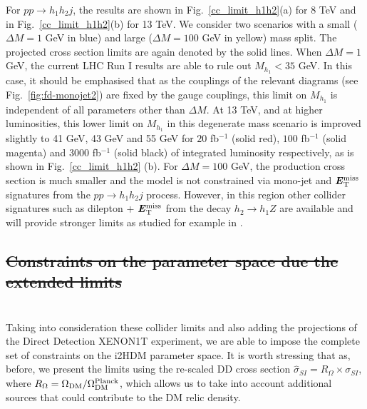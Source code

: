 \documentclass[12pt,a4paper]{article}
\newcommand{\MET}{\textbf{\textit{E}$_{\rm T}^{\rm miss}$}}
\providecommand{\DIFaddtex}[1]{{\protect\color{blue}\uwave{#1}}} %
\providecommand{\DIFdeltex}[1]{{\protect\color{red}\sout{#1}}}                      %
\providecommand{\DIFaddbegin}{} %
\providecommand{\DIFaddend}{} %
\providecommand{\DIFdelbegin}{} %
\providecommand{\DIFdelend}{} %
\providecommand{\DIFadd}[1]{\texorpdfstring{\DIFaddtex{#1}}{#1}} %
\providecommand{\DIFdel}[1]{\texorpdfstring{\DIFdeltex{#1}}{}} %
\begin{document}
For $pp\rightarrow h_1h_2 j$, the results are shown in Fig.~\ref{cc_limit_h1h2}(a) for 8 TeV and in Fig.~\ref{cc_limit_h1h2}(b) for 13 TeV. We consider two scenarios with a small ($\Delta M =1$ GeV in blue) and large ($\Delta M =100$ GeV in yellow) mass split. The projected cross section limits are again denoted by the solid lines. When $\Delta M = 1$ GeV, the current LHC Run I results are able to rule out $M_{h_1} < 35$ GeV. In this case, it should be emphasised that as the couplings of the relevant diagrams (see Fig.~\ref{fig:fd-monojet2}) are fixed by the gauge couplings, this limit on $M_{h_1}$ is independent of all parameters other than $\Delta M$. At 13 TeV, and at higher luminosities, this lower limit on $M_{h_1}$ in this degenerate mass scenario is improved slightly to 41 GeV, 43 GeV and 55 GeV for $20$ fb$^{-1}$ (solid red), $100$ fb$^{-1}$ (solid magenta) and $3000$ fb$^{-1}$ (solid black) of integrated luminosity respectively, as is shown in Fig.~\ref{cc_limit_h1h2} (b). For $\Delta M = 100$ GeV, the production cross section is much smaller and the model is not constrained via mono-jet and $\MET{}$ signatures from the $pp\rightarrow h_1h_2 j$ process. However, in this region other collider signatures such as dilepton + $\MET{}$ from the decay $h_2 \to h_1Z$ are available and will provide stronger limits as studied for example in \cite{Belanger:2015kga}.


%
%
\DIFdelbegin \subsection{\DIFdel{Constraints on the parameter space due the extended limits}}
\addtocounter{subsection}{-1}%
\DIFdelend %
\DIFaddbegin \section{\DIFadd{Constraining i2HDM: future projections}}
\DIFaddend 

Taking into consideration these collider limits and also adding the projections of the Direct Detection XENON1T experiment,
we are able to impose the complete set of constraints on the i2HDM parameter space. 
It is worth stressing that as,  before, we  present the limits using  the re-scaled DD cross section 
$\hat{\sigma}_{SI}= R_\Omega\times \sigma_{SI}$, where $R_\Omega = \Omega_{\rm DM}/\Omega^{\rm Planck}_{\rm DM}$, which allows us to take into account additional sources that could contribute to the DM relic density. 
\end{document}
